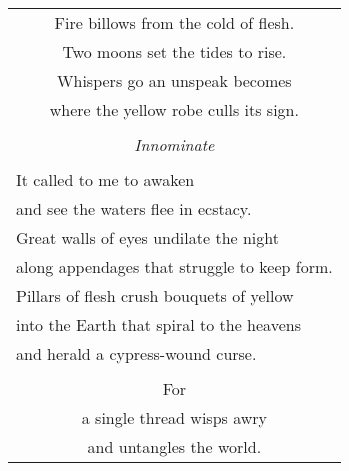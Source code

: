 \documentclass{article}
\begin{document}
\begin{center}
\begin{tabular}{l}
\multicolumn{1}{c}{Fire billows from the cold of flesh.} \\
\multicolumn{1}{c}{Two moons set the tides to rise.} \\
\multicolumn{1}{c}{Whispers go an unspeak becomes} \\
\multicolumn{1}{c}{where the yellow robe culls its sign.} \\
\\
\multicolumn{1}{c}{\textit{Innominate}} \\ %
\\
It called to me to awaken \\
and see the waters flee in ecstacy. \\
Great walls of eyes undilate the night \\
along appendages that struggle to keep form. \\
Pillars of flesh crush bouquets of yellow \\
into the Earth that spiral to the heavens \\
and herald a cypress-wound curse. \\
\\
\multicolumn{1}{c}{For} \\
\multicolumn{1}{c}{a single thread wisps awry} \\
\multicolumn{1}{c}{and untangles the world.} \\
\end{tabular}
\end{center}
\end{document}
